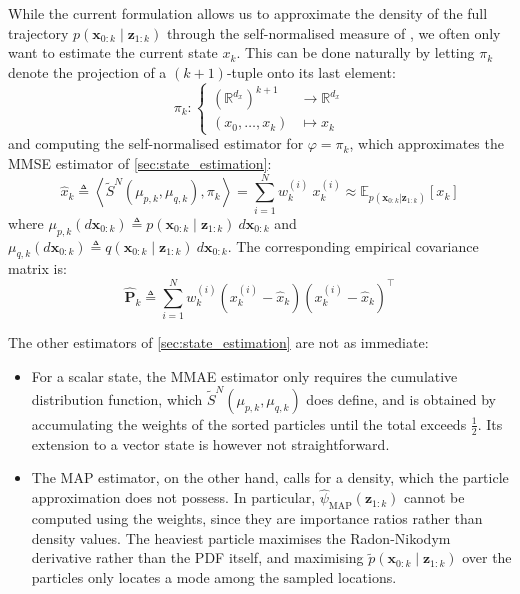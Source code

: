 While the current formulation allows us to approximate the density of the full trajectory $p(\mathbf{x}_{0:k}\mid\mathbf{z}_{1:k})$ through the self-normalised measure of , we often only want to estimate the current state $x_k$. This can be done naturally by letting $\pi_k$ denote the projection of a $(k+1)$-tuple onto its last element:
\begin{equation}
	\pi_k:\left\{\begin{aligned}
	\left(\mathbb{R}^{d_x}\right)^{k+1}&\to\mathbb{R}^{d_x}\\
	(x_0,\dots,x_k)&\mapsto x_k
	\end{aligned}\right.
\end{equation}
and computing the self-normalised estimator for $\varphi=\pi_k$, which approximates the MMSE estimator of \cref{sec:state_estimation}:
\begin{equation}
	\hat{x}_k\triangleq\left\langle\tilde{S}^N(\mu_{p,k},\mu_{q,k}),\pi_k\right\rangle=\sum_{i=1}^Nw_k^{(i)}\:x_k^{(i)}\approx\mathbb{E}_{p(\mathbf{x}_{0:k}|\mathbf{z}_{1:k})}[x_k]\label{eq:PF_MMSE}
\end{equation}
where $\mu_{p,k}(d\mathbf{x}_{0:k})\triangleq p(\mathbf{x}_{0:k}\mid\mathbf{z}_{1:k})\:d\mathbf{x}_{0:k}$ and $\mu_{q,k}(d\mathbf{x}_{0:k})\triangleq q(\mathbf{x}_{0:k}\mid\mathbf{z}_{1:k})\:d\mathbf{x}_{0:k}$. The corresponding empirical covariance matrix is:
\begin{equation}
	\hat{\mathbf{P}}_k\triangleq\sum_{i=1}^Nw_k^{(i)}\left(x_k^{(i)}-\hat{x}_k\right)\left(x_k^{(i)}-\hat{x}_k\right)^\top
\end{equation}

The other estimators of \cref{sec:state_estimation} are not as immediate:
\begin{itemize}
	\item For a scalar state, the MMAE estimator only requires the cumulative distribution function, which $\tilde{S}^N(\mu_{p,k},\mu_{q,k})$ does define, and is obtained by accumulating the weights of the sorted particles until the total exceeds $\frac{1}{2}$. Its extension to a vector state is however not straightforward.
	\item The MAP estimator, on the other hand, calls for a density, which the particle approximation does not possess. In particular, $\hat{\psi}_{\mathrm{MAP}}(\mathbf{z}_{1:k})$ cannot be computed using the weights, since they are importance ratios rather than density values. The heaviest particle maximises the Radon-Nikodym derivative rather than the PDF itself, and maximising $\tilde{p}(\mathbf{x}_{0:k}\mid\mathbf{z}_{1:k})$ over the particles only locates a mode among the sampled locations.
\end{itemize}

